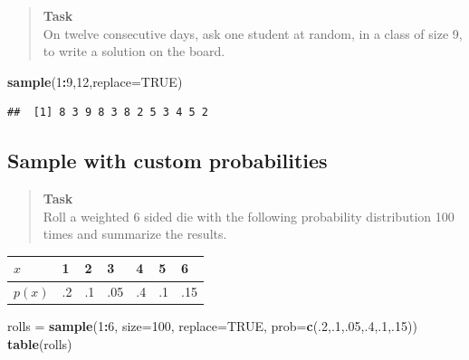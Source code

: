\documentclass[
]{book}
\newenvironment{Shaded}{\begin{snugshade}}{\end{snugshade}}
\newcommand{\AttributeTok}[1]{\textcolor[rgb]{0.13,0.29,0.53}{#1}}
\newcommand{\ConstantTok}[1]{\textcolor[rgb]{0.56,0.35,0.01}{#1}}
\newcommand{\DecValTok}[1]{\textcolor[rgb]{0.00,0.00,0.81}{#1}}
\newcommand{\FunctionTok}[1]{\textcolor[rgb]{0.13,0.29,0.53}{\textbf{#1}}}
\newcommand{\NormalTok}[1]{#1}
\newcommand{\OtherTok}[1]{\textcolor[rgb]{0.56,0.35,0.01}{#1}}
\newcommand{\SpecialCharTok}[1]{\textcolor[rgb]{0.81,0.36,0.00}{\textbf{#1}}}
\theoremstyle{definition}
\theoremstyle{definition}
\theoremstyle{definition}
\theoremstyle{definition}
\theoremstyle{remark}
\begin{document}
\begin{quote}
\textbf{Task}\\
On twelve consecutive days, ask one student at random, in a class of size 9, to write a solution on the board.
\end{quote}

\begin{Shaded}
\begin{Highlighting}[]
\FunctionTok{sample}\NormalTok{(}\DecValTok{1}\SpecialCharTok{:}\DecValTok{9}\NormalTok{,}\DecValTok{12}\NormalTok{,}\AttributeTok{replace=}\ConstantTok{TRUE}\NormalTok{)}
\end{Highlighting}
\end{Shaded}

\begin{verbatim}
##  [1] 8 3 9 8 3 8 2 5 3 4 5 2
\end{verbatim}

\subsection{Sample with custom probabilities}\label{sample-with-custom-probabilities}

\begin{quote}
\textbf{Task}\\
Roll a weighted 6 sided die with the following probability distribution 100 times and summarize the results.
\end{quote}

\begin{longtable}[]{@{}lllllll@{}}
\toprule\noalign{}
\(x\) & 1 & 2 & 3 & 4 & 5 & 6 \\
\midrule\noalign{}
\endhead
\bottomrule\noalign{}
\endlastfoot
\(p(x)\) & .2 & .1 & .05 & .4 & .1 & .15 \\
\end{longtable}

\begin{Shaded}
\begin{Highlighting}[]
\NormalTok{rolls }\OtherTok{=} \FunctionTok{sample}\NormalTok{(}\DecValTok{1}\SpecialCharTok{:}\DecValTok{6}\NormalTok{,}
               \AttributeTok{size=}\DecValTok{100}\NormalTok{,}
               \AttributeTok{replace=}\ConstantTok{TRUE}\NormalTok{,}
               \AttributeTok{prob=}\FunctionTok{c}\NormalTok{(.}\DecValTok{2}\NormalTok{,.}\DecValTok{1}\NormalTok{,.}\DecValTok{05}\NormalTok{,.}\DecValTok{4}\NormalTok{,.}\DecValTok{1}\NormalTok{,.}\DecValTok{15}\NormalTok{))}
\FunctionTok{table}\NormalTok{(rolls)}
\end{Highlighting}
\end{Shaded}
\end{document}
